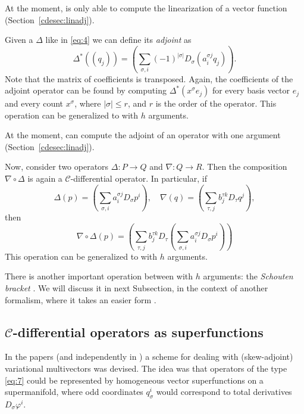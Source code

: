 At the moment, \cde is only able to compute the linearization of a vector
function (Section~\ref{cdesec:linadj}).

Given a \cdiffop $\Delta$ like in \eqref{eq:4} we can define its \emph{adjoint}
as
\begin{equation}\label{eq:5}
  \Delta^*((q_j)) =
  (\sum_{\sigma, i}  (-1)^{|\sigma|} D_\sigma(a^{\sigma j}_i q_j)).
\end{equation}
Note that the matrix of coefficients is transposed. Again, the coefficients of
the adjoint operator can be found by computing $\Delta^*(x^\sigma e_j)$ for
every basis vector $e_j$ and every count $x^\sigma$, where $|\sigma|\leq r$,
and $r$ is the order of the operator. This operation can be generalized to
\cdiffops with $h$ arguments.

At the moment, \cde can compute the adjoint of an operator with one argument
(Section~\ref{cdesec:linadj}).

Now, consider two operators $\Delta\colon P\to Q$ and $\nabla\colon Q\to R$.
Then the composition $\nabla\circ\Delta$ is again a $\mathcal{C}$-differential
operator. In particular, if
\[
  \Delta(p) = (\sum_{\sigma, i}a^{\sigma j}_i D_\sigma p^i),\quad
  \nabla(q) = (\sum_{\tau, j}b^{\tau k}_j D_\tau q^j),
\]
then
\[
  \nabla\circ\Delta(p) =
  (\sum_{\tau, j}b^{\tau k}_j D_\tau (\sum_{\sigma, i}a^{\sigma j}_i D_\sigma p^i))
\]
This operation can be generalized to
\cdiffops with $h$ arguments.

There is another important operation between \cdiffops with $h$ arguments: the
\emph{Schouten bracket} \cite{Krasilshchik:99}. We will discuss it in next Subsection, in
the context of another formalism, where it takes an easier form \cite{KerstenKrasilshchikVerboretsky:2004}.

\subsection[C-differential operators as superfunctions]{$\mathcal{C}$-differential operators as superfunctions}
\label{cdesec:mathc-diff-oper-odd}

In the papers \cite{IgoninVerbovetskyVitolo:2004,KerstenKrasilshchikVerboretsky:2004} (and independently in \cite{Getzler:2002}) a scheme for
dealing with (skew-adjoint) variational multivectors was devised. The idea was
that operators of the type \eqref{eq:7} could be represented by homogeneous
vector superfunctions on a supermanifold, where odd coordinates $q^i_\sigma$
would correspond to total derivatives $D_\sigma\varphi^i$. 

